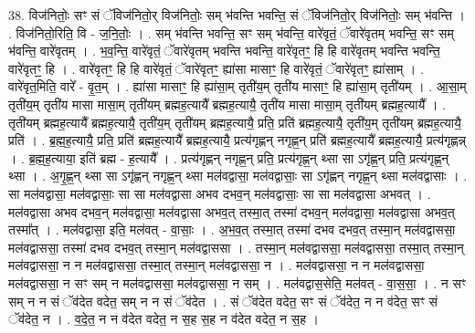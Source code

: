 \documentclass[17pt]{extarticle}
\begin{document}
38. विज॑नितोः॒ सꣳ सं ॅविज॑नितो॒र् विज॑नितोः॒ सम् भ॑वन्ति भवन्ति॒ सं ॅविज॑नितो॒र् विज॑नितोः॒ सम् भ॑वन्ति । . विज॑नितो॒रिति॒ वि - ज॒नि॒तोः॒ । . सम् भ॑वन्ति भवन्ति॒ सꣳ सम् भ॑वन्ति॒ वारे॑वृतं॒ ॅवारे॑वृतम् भवन्ति॒ सꣳ सम् भ॑वन्ति॒ वारे॑वृतम् । . भ॒व॒न्ति॒ वारे॑वृतं॒ ॅवारे॑वृतम् भवन्ति भवन्ति॒ वारे॑वृतꣳ॒॒ हि हि वारे॑वृतम् भवन्ति भवन्ति॒ वारे॑वृतꣳ॒॒ हि । . वारे॑वृतꣳ॒॒ हि हि वारे॑वृतं॒ ॅवारे॑वृतꣳ॒॒ ह्या॑सा मासाꣳ॒॒ हि वारे॑वृतं॒ ॅवारे॑वृतꣳ॒॒ ह्या॑साम् । . वारे॑वृत॒मिति॒ वारे᳚ - वृ॒त॒म् । . ह्या॑सा मासाꣳ॒॒ हि ह्या॑सा॒म् तृती॑य॒म् तृती॑य मासाꣳ॒॒ हि ह्या॑सा॒म् तृती॑यम् । . आ॒सा॒म् तृती॑य॒म् तृती॑य मासा मासा॒म् तृती॑यम् ब्रह्मह॒त्यायै᳚ ब्रह्मह॒त्यायै॒ तृती॑य मासा मासा॒म् तृती॑यम् ब्रह्मह॒त्यायै᳚ । . तृती॑यम् ब्रह्मह॒त्यायै᳚ ब्रह्मह॒त्यायै॒ तृती॑य॒म् तृती॑यम् ब्रह्मह॒त्यायै॒ प्रति॒ प्रति॑ ब्रह्मह॒त्यायै॒ तृती॑य॒म् तृती॑यम् ब्रह्मह॒त्यायै॒ प्रति॑ । . ब्र॒ह्म॒ह॒त्यायै॒ प्रति॒ प्रति॑ ब्रह्मह॒त्यायै᳚ ब्रह्मह॒त्यायै॒ प्रत्य॑गृह्णन् नगृह्ण॒न् प्रति॑ ब्रह्मह॒त्यायै᳚ ब्रह्मह॒त्यायै॒ प्रत्य॑गृह्णन्न् । . ब्र॒ह्म॒ह॒त्याया॒ इति॑ ब्रह्म - ह॒त्यायै᳚ । . प्रत्य॑गृह्णन् नगृह्ण॒न् प्रति॒ प्रत्य॑गृह्ण॒न् थ्सा सा ऽगृ॑ह्ण॒न् प्रति॒ प्रत्य॑गृह्ण॒न् थ्सा । . अ॒गृ॒ह्ण॒न् थ्सा सा ऽगृ॑ह्णन् नगृह्ण॒न् थ्सा मल॑वद्वासा॒ मल॑वद्वासाः॒ सा ऽगृ॑ह्णन् नगृह्ण॒न् थ्सा मल॑वद्वासाः । . सा मल॑वद्वासा॒ मल॑वद्वासाः॒ सा सा मल॑वद्वासा अभव दभव॒न् मल॑वद्वासाः॒ सा सा मल॑वद्वासा अभवत् । . मल॑वद्वासा अभव दभव॒न् मल॑वद्वासा॒ मल॑वद्वासा अभव॒त् तस्मा॒त् तस्मा॑ दभव॒न् मल॑वद्वासा॒ मल॑वद्वासा अभव॒त् तस्मा᳚त् । . मल॑वद्वासा॒ इति॒ मल॑वत् - वा॒साः॒ । . अ॒भ॒व॒त् तस्मा॒त् तस्मा॑ दभव दभव॒त् तस्मा॒न् मल॑वद्वाससा॒ मल॑वद्वाससा॒ तस्मा॑ दभव दभव॒त् तस्मा॒न् मल॑वद्वाससा । . तस्मा॒न् मल॑वद्वाससा॒ मल॑वद्वाससा॒ तस्मा॒त् तस्मा॒न् मल॑वद्वाससा॒ न न मल॑वद्वाससा॒ तस्मा॒त् तस्मा॒न् मल॑वद्वाससा॒ न । . मल॑वद्वाससा॒ न न मल॑वद्वाससा॒ मल॑वद्वाससा॒ न सꣳ सम् न मल॑वद्वाससा॒ मल॑वद्वाससा॒ न सम् । . मल॑वद्वास॒सेति॒ मल॑वत् - वा॒स॒सा॒ । . न सꣳ सम् न न सं ॅव॑देत वदेत॒ सम् न न सं ॅव॑देत । . सं ॅव॑देत वदेत॒ सꣳ सं ॅव॑देत॒ न न व॑देत॒ सꣳ सं ॅव॑देत॒ न । . व॒दे॒त॒ न न व॑देत वदेत॒ न स॒ह स॒ह न व॑देत वदेत॒ न स॒ह । \newline
\pagebreak
{}
\end{document}
